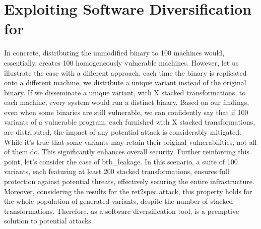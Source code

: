 \chapter{Exploiting Software Diversification for \Wasm}
\label{method}










In concrete, distributing the unmodified binary to 100 machines would, essentially, creates 100 homogeneously vulnerable machines.
However, let us illustrate the case with a different approach: each time the binary is replicated onto a different machine, we distribute a unique variant instead of the original binary. 
If we disseminate a unique variant, with X stacked transformations, to each machine, every system would run a distinct \wasm binary. 
Based on our findings, even when some binaries are still vulnerable, we can confidently say that if 100 variants of a vulnerable program, each furnished with X stacked transformations, are distributed, the impact of any potential attack is considerably mitigated.
While it's true that some variants may retain their original vulnerabilities, not all of them do. 
This significantly enhances overall security. 
Further reinforcing this point, let's consider the case of btb\_leakage. 
In this scenario, a suite of 100 variants, each featuring at least 200 stacked transformations, ensures full protection against potential threats, effectively securing the entire infrastructure.
Moreover, considering the results for the ret2spec attack, this property holds for the whole population of generated variants, despite the number of stacked transformations.
Therefore, \tool as a software diversification tool, is a peemptive solution to potential attacks.


